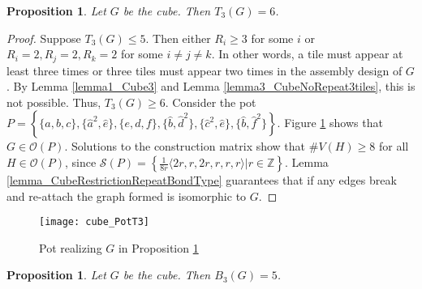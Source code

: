 \documentclass{elsarticle}
\newtheorem{proposition}[theorem]{Proposition}
\theoremstyle{definition}
\theoremstyle{remark}
\theoremstyle{plain}
\theoremstyle{plain}
\begin{document}
 \begin{proposition}\label{prop:CubeT3}
 Let $G$ be the cube. Then $T_3(G)=6$.
 \end{proposition} 

 \begin{proof}

 Suppose $T_3(G) \leq 5$. Then either $R_i \geq 3$ for some $i$ or $R_i = 2, R_j = 2, R_k = 2$ for some $i \neq j \neq k$. In other words, a tile must appear at least three times or three tiles must appear two times in the assembly design of $G$.  By Lemma \ref{lemma1_Cube3} and   Lemma \ref{lemma3_CubeNoRepeat3tiles}, this is not possible. Thus, $T_3(G)\geq 6$. Consider the pot $P = \left\{\{a,b,c\}, \{\hat{a}^2,\hat{e}\}, \{e, d, f\}, \{\hat{b}, \hat{d}^2\}, \{\hat{c}^2, \hat{e}\},\{\hat{b}, \hat{f}^2\} \right\}$. Figure \ref{fig:Cube13} shows that $G \in \mathcal{O}(P)$. Solutions to the construction matrix show that $\# V(H) \geq 8$ for all $H \in \mathcal{O}(P)$, since $\mathcal{S}(P)=\left\{\frac{1}{8r} \langle 2r,r,2r,r,r,r \rangle | r \in \mathbb{Z}\right\}$. Lemma \ref{lemma_CubeRestrictionRepeatBondType} guarantees that if any edges break and re-attach the graph formed is isomorphic to $G$. %
\end{proof}




       \begin{figure}[h!]
      \centering
      \texttt{[image: cube\_PotT3]}
      \caption{Pot realizing $G$ in Proposition \ref{prop:CubeT3}}
      \label{fig:Cube13}
  \end{figure}
  
  


\begin{proposition}\label{prop:CubeB3}
Let $G$ be the cube. Then $B_3(G)=5$.
\end{proposition}
\end{document}
